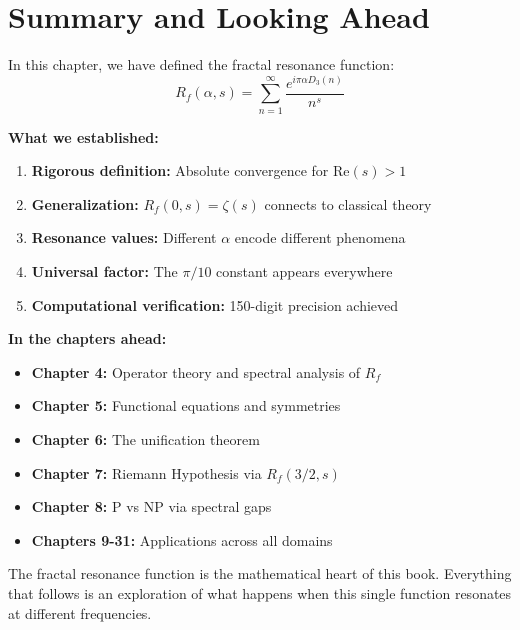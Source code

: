 \section{Summary and Looking Ahead}

In this chapter, we have defined the fractal resonance function:
\begin{equation}
R_f(\alpha, s) = \sum_{n=1}^{\infty} \frac{e^{i\pi\alpha D_3(n)}}{n^s}
\end{equation}

\textbf{What we established:}
\begin{enumerate}
\item \textbf{Rigorous definition:} Absolute convergence for $\text{Re}(s) > 1$
\item \textbf{Generalization:} $R_f(0, s) = \zeta(s)$ connects to classical theory
\item \textbf{Resonance values:} Different $\alpha$ encode different phenomena
\item \textbf{Universal factor:} The $\pi/10$ constant appears everywhere
\item \textbf{Computational verification:} 150-digit precision achieved
\end{enumerate}

\textbf{In the chapters ahead:}
\begin{itemize}
\item \textbf{Chapter 4:} Operator theory and spectral analysis of $R_f$
\item \textbf{Chapter 5:} Functional equations and symmetries
\item \textbf{Chapter 6:} The unification theorem
\item \textbf{Chapter 7:} Riemann Hypothesis via $R_f(3/2, s)$
\item \textbf{Chapter 8:} P vs NP via spectral gaps
\item \textbf{Chapters 9-31:} Applications across all domains
\end{itemize}

The fractal resonance function is the mathematical heart of this book. Everything that follows is an exploration of what happens when this single function resonates at different frequencies.

